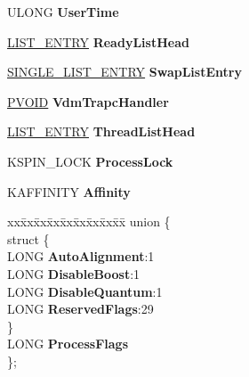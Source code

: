 \begin{DoxyCompactItemize}
U\+L\+O\+NG {\bfseries User\+Time}
\item 
\mbox{\label{struct___k_p_r_o_c_e_s_s_ae3b91e4619fecc2bc3339e221bc2f4c2}} 
\hyperlink{struct___l_i_s_t___e_n_t_r_y}{L\+I\+S\+T\+\_\+\+E\+N\+T\+RY} {\bfseries Ready\+List\+Head}
\item 
\mbox{\label{struct___k_p_r_o_c_e_s_s_a1da094aef04c704775ab4dbba81b8c50}} 
\hyperlink{struct___s_i_n_g_l_e___l_i_s_t___e_n_t_r_y}{S\+I\+N\+G\+L\+E\+\_\+\+L\+I\+S\+T\+\_\+\+E\+N\+T\+RY} {\bfseries Swap\+List\+Entry}
\item 
\mbox{\label{struct___k_p_r_o_c_e_s_s_a699e2c87faea663c40e4fbf2fd4d6306}} 
\hyperlink{interfacevoid}{P\+V\+O\+ID} {\bfseries Vdm\+Trapc\+Handler}
\item 
\mbox{\label{struct___k_p_r_o_c_e_s_s_ae01f870b8df6ecc7940a46f0480a4291}} 
\hyperlink{struct___l_i_s_t___e_n_t_r_y}{L\+I\+S\+T\+\_\+\+E\+N\+T\+RY} {\bfseries Thread\+List\+Head}
\item 
\mbox{\label{struct___k_p_r_o_c_e_s_s_aebf7d7f36bd20897149731b47989f535}} 
K\+S\+P\+I\+N\+\_\+\+L\+O\+CK {\bfseries Process\+Lock}
\item 
\mbox{\label{struct___k_p_r_o_c_e_s_s_aa3660f166cd8d9ac4543344f81cb1907}} 
K\+A\+F\+F\+I\+N\+I\+TY {\bfseries Affinity}
\item 
\mbox{\label{struct___k_p_r_o_c_e_s_s_a68a31d38a9fdb4dcc51ae8f94812db71}} 
\begin{tabbing}
xx\=xx\=xx\=xx\=xx\=xx\=xx\=xx\=xx\=\kill
union \{\\
\mbox{\label{union___k_p_r_o_c_e_s_s_1_1_0D2132_adcccf4f4bc76a22211a5ad1702a2fc7f}} 
\>struct \{\\
\>\>LONG {\bfseries AutoAlignment}:1\\
\>\>LONG {\bfseries DisableBoost}:1\\
\>\>LONG {\bfseries DisableQuantum}:1\\
\>\>LONG {\bfseries ReservedFlags}:29\\
\>\} \\
\>LONG {\bfseries ProcessFlags}\\
\}; \\


\end{tabbing}
\end{DoxyCompactItemize}
